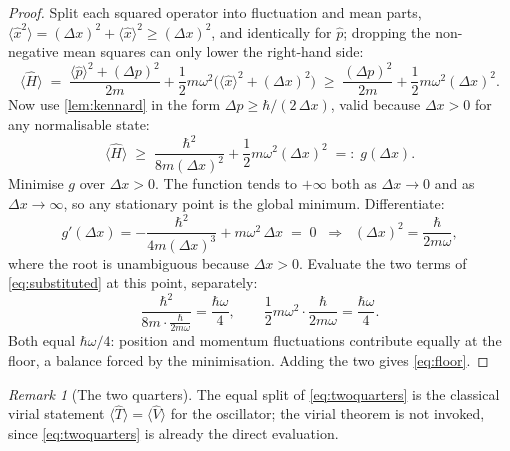 \documentclass[11pt]{amsbook}
\theoremstyle{plain}
\theoremstyle{definition}
\theoremstyle{remark}
\newtheorem{remark}[theorem]{Remark}
\begin{document}
\begin{proof}
Split each squared operator into fluctuation and mean parts, $\langle \hat x^{2} \rangle = (\Delta x)^{2} + \langle \hat x \rangle^{2} \geq (\Delta x)^{2}$, and identically for $\hat p$; dropping the non-negative mean squares can only lower the right-hand side:
\begin{equation}\label{eq:meanssplit}
\langle \hat H \rangle \;=\; \frac{\langle \hat p \rangle^{2} + (\Delta p)^{2}}{2m} + \frac{1}{2} m \omega^{2}\bigl( \langle \hat x \rangle^{2} + (\Delta x)^{2} \bigr) \;\geq\; \frac{(\Delta p)^{2}}{2m} + \frac{1}{2} m \omega^{2} (\Delta x)^{2}.
\end{equation}
Now use \cref{lem:kennard} in the form $\Delta p \geq \hbar / (2\,\Delta x)$, valid because $\Delta x > 0$ for any normalisable state:
\begin{equation}\label{eq:substituted}
\langle \hat H \rangle \;\geq\; \frac{\hbar^{2}}{8 m (\Delta x)^{2}} + \frac{1}{2} m \omega^{2} (\Delta x)^{2} \;=:\; g(\Delta x).
\end{equation}
Minimise $g$ over $\Delta x > 0$. The function tends to $+\infty$ both as $\Delta x \to 0$ and as $\Delta x \to \infty$, so any stationary point is the global minimum. Differentiate:
\begin{equation}\label{eq:derivative}
g'(\Delta x) = -\frac{\hbar^{2}}{4 m (\Delta x)^{3}} + m \omega^{2}\, \Delta x \;=\;0
\;\;\Longrightarrow\;\;
(\Delta x)^{2} = \frac{\hbar}{2 m \omega},
\end{equation}
where the root is unambiguous because $\Delta x > 0$. Evaluate the two terms of \cref{eq:substituted} at this point, separately:
\begin{equation}\label{eq:twoquarters}
\frac{\hbar^{2}}{8 m \cdot \frac{\hbar}{2 m \omega}} = \frac{\hbar \omega}{4},
\qquad
\frac{1}{2} m \omega^{2} \cdot \frac{\hbar}{2 m \omega} = \frac{\hbar \omega}{4}.
\end{equation}
Both equal $\hbar\omega/4$: position and momentum fluctuations contribute equally at the floor, a balance forced by the minimisation. Adding the two gives \cref{eq:floor}.
\end{proof}

\begin{remark}[The two quarters]\label{rem:quarters}
The equal split of \cref{eq:twoquarters} is the classical virial statement $\langle \hat T \rangle = \langle \hat V \rangle$ for the oscillator; the virial theorem is not invoked, since \cref{eq:twoquarters} is already the direct evaluation.
\end{remark}
\end{document}
